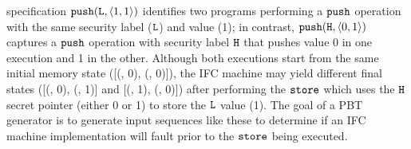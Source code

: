 specification $\boldsymbol{{\tt push}}({{\tt L}, \langle 1,1\rangle})$ identifies
two programs performing a $\boldsymbol{{\tt push}}$ operation with the same
security label (${\tt L}$) and value (1); in contrast,
$\boldsymbol{{\tt push}}({{\tt H}, \langle 0, 1\rangle})$ captures a $\boldsymbol{{\tt push}}$
operation with security label ${\tt H}$ that pushes value 0 in one
execution and 1 in the other.  Although both executions start from the
same initial memory state ([{(, 0), (, 0)}]), the IFC
machine may yield different final states ([{(, 0), (,
    1)}] and [{(, 1), (, 0)}]) after performing the
$\boldsymbol{{\tt store}}$ which uses the ${\tt H}$ secret pointer (either 0 or 1)
to store the ${\tt L}$ value (1).  The goal of a PBT generator is to
generate input sequences like these to determine if an IFC machine
implementation will fault prior to the $\boldsymbol{{\tt store}}$ being executed.

